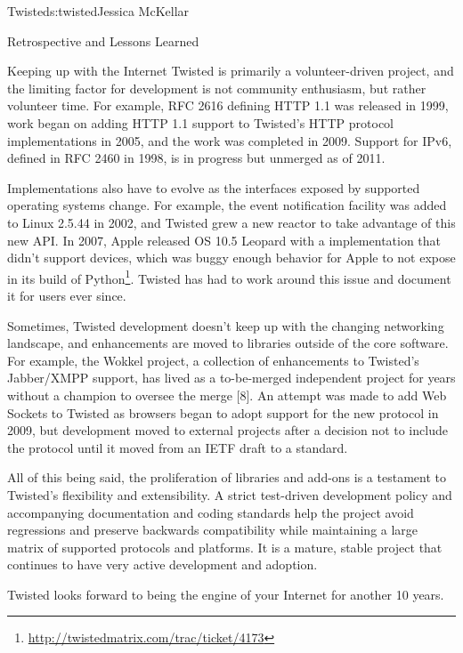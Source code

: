 \begin{aosachapter}{Twisted}{s:twisted}{Jessica McKellar}
\begin{aosasect1}{Retrospective and Lessons Learned}
\begin{aosasect2}{Keeping up with the Internet}
Twisted is primarily a volunteer-driven project, and the limiting factor for
development is not community enthusiasm, but rather volunteer time. For example,
RFC 2616 defining HTTP 1.1 was released in 1999, work began on adding HTTP 1.1
support to Twisted's HTTP protocol implementations in 2005, and the work was
completed in 2009.  Support for IPv6, defined in RFC 2460 in 1998, is in
progress but unmerged as of 2011.

Implementations also have to evolve as the interfaces exposed by
supported operating systems change. For example, the 
event notification facility was added to Linux 2.5.44 in 2002, and
Twisted grew a new  reactor to take advantage of this new
API. In 2007, Apple released OS 10.5 Leopard with a 
implementation that didn't support devices, which was buggy enough
behavior for Apple to not expose  in its build of
Python\footnote{\url{http://twistedmatrix.com/trac/ticket/4173}}.
Twisted has had to work around this issue and document it for users
ever since.

Sometimes, Twisted development doesn't keep up with the changing networking
landscape, and enhancements are moved to libraries outside of the core
software. For example, the Wokkel project, a collection of enhancements to
Twisted's Jabber/XMPP support, has lived as a to-be-merged independent project
for years without a champion to oversee the merge [8]. An attempt was made to
add Web Sockets to Twisted as browsers began to adopt support for the new
protocol in 2009, but development moved to external projects after a decision
not to include the protocol until it moved from an IETF draft to a standard.

All of this being said, the proliferation of libraries and add-ons is a
testament to Twisted's flexibility and extensibility. A strict test-driven
development policy and accompanying documentation and coding standards help the
project avoid regressions and preserve backwards compatibility while maintaining
a large matrix of supported protocols and platforms. It is a mature, stable
project that continues to have very active development and adoption.

Twisted looks forward to being the engine of your Internet for another 10
years.

\end{aosasect2}

\end{aosasect1}

\end{aosachapter}
